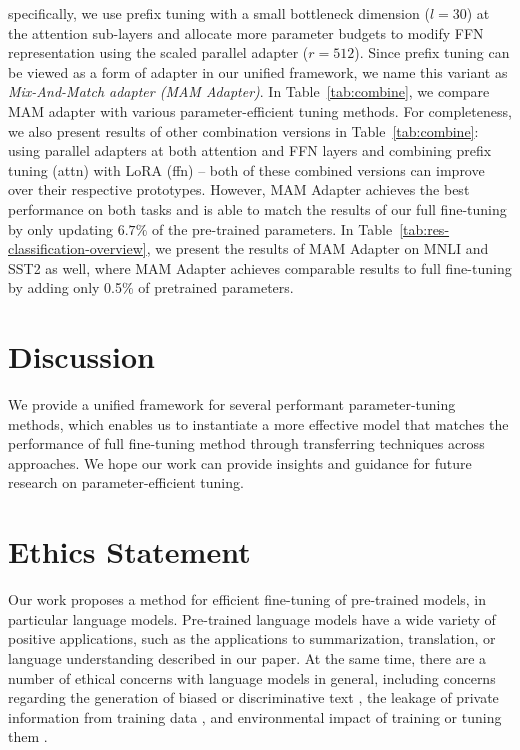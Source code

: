 specifically, we use prefix tuning with a small bottleneck dimension ($l=30$) at the attention sub-layers and allocate more parameter budgets to modify FFN representation using the scaled parallel adapter ($r=512$). Since prefix tuning can be viewed as a form of adapter in our unified framework, we name this variant as \emph{Mix-And-Match adapter (MAM Adapter)}. In Table~\ref{tab:combine}, we compare MAM adapter with various parameter-efficient tuning methods. For completeness, we also present results of other combination versions in Table~\ref{tab:combine}: using parallel adapters at both attention and FFN layers and combining prefix tuning (attn) with LoRA (ffn) -- both of these combined versions can improve over their respective prototypes. However, MAM Adapter achieves the best performance on both tasks and is able to match the results of our full fine-tuning by only updating $6.7\%$ of the pre-trained parameters. In Table~\ref{tab:res-classification-overview}, we present the results of MAM Adapter on MNLI and SST2 as well, where MAM Adapter achieves comparable results to full fine-tuning by adding only 0.5\% of pretrained parameters.   

\section{Discussion}

We provide a unified framework for several performant parameter-tuning methods, which enables us to instantiate a more effective model that matches the performance of full fine-tuning method through transferring techniques across approaches. We hope our work can provide insights and guidance for future research on parameter-efficient tuning.

\section*{Ethics Statement}

Our work proposes a method for efficient fine-tuning of pre-trained models, in particular language models. Pre-trained language models have a wide variety of positive applications, such as the applications to summarization, translation, or language understanding described in our paper. At the same time, there are a number of ethical concerns with language models in general, including concerns regarding the generation of biased or discriminative text \citep{bordia-bowman-2019-identifying}, the leakage of private information from training data \citep{carlini2020extracting}, and environmental impact of training or tuning them \citep{strubell-etal-2019-energy}.

